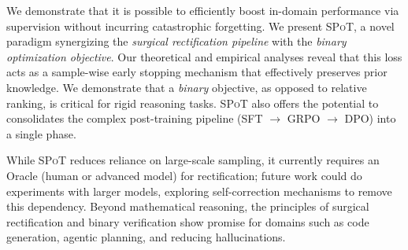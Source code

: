 \documentclass{article}
\newcommand{\methodName}{{\textsc{SPoT}}\xspace}
\theoremstyle{plain}
\theoremstyle{definition}
\theoremstyle{remark}
\begin{document}








We demonstrate that it is possible to efficiently boost in-domain performance via supervision without incurring catastrophic forgetting. We present \methodName, a novel paradigm synergizing the \textit{surgical rectification pipeline} with the \textit{binary optimization objective}. Our theoretical and empirical analyses reveal that this loss acts as a sample-wise early stopping mechanism that effectively preserves prior knowledge. We demonstrate that a \textit{binary} objective, as opposed to relative ranking, is critical for rigid reasoning tasks. \methodName also offers the potential to consolidates the complex post-training pipeline (SFT $\to$ GRPO $\to$ DPO) into a single phase.

While \methodName reduces reliance on large-scale sampling, it currently requires an Oracle (human or advanced model) for rectification; future work could do experiments with larger models, exploring self-correction mechanisms to remove this dependency. Beyond mathematical reasoning, the principles of surgical rectification and binary verification show promise for domains such as code generation, agentic planning, and reducing hallucinations.
\end{document}
